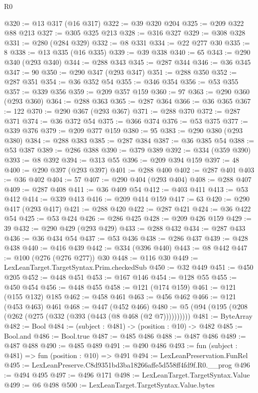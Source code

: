 \begin{lexlean}{R0}
\begin{coremodule}
@320 := @13 @317 (@16 @317)
@322 := @39 @320 @204
@325 := @209 @322 @88 @213
@327 := @305 @325 @213
@328 := @316 @327
@329 := @308 @328
@331 := @280 (@284 @329)
@332 := @8 @331
@334 := @22 @277 @30
@335 := 8
@338 := @13 @335 (@16 @335)
@339 := @39 @338
@340 := 65
@343 := @290 @340 (@293 @340)
@344 := @288 @343
@345 := @287 @344
@346 := @36 @345
@347 := 90
@350 := @290 @347 (@293 @347)
@351 := @288 @350
@352 := @287 @351
@354 := @36 @352 @54
@355 := @346 @354
@356 := @53 @355
@357 := @339 @356
@359 := @209 @357 @159
@360 := 97
@363 := @290 @360 (@293 @360)
@364 := @288 @363
@365 := @287 @364
@366 := @36 @365
@367 := 122
@370 := @290 @367 (@293 @367)
@371 := @288 @370
@372 := @287 @371
@374 := @36 @372 @54
@375 := @366 @374
@376 := @53 @375
@377 := @339 @376
@379 := @209 @377 @159
@380 := 95
@383 := @290 @380 (@293 @380)
@384 := @288 @383
@385 := @287 @384
@387 := @36 @385 @54
@388 := @53 @387
@389 := @286 @388
@390 := @379 @389
@392 := @334 (@359 @390)
@393 := @8 @392
@394 := @313 @55
@396 := @209 @394 @159
@397 := 48
@400 := @290 @397 (@293 @397)
@401 := @288 @400
@402 := @287 @401
@403 := @36 @402
@404 := 57
@407 := @290 @404 (@293 @404)
@408 := @288 @407
@409 := @287 @408
@411 := @36 @409 @54
@412 := @403 @411
@413 := @53 @412
@414 := @339 @413
@416 := @209 @414 @159
@417 := 63
@420 := @290 @417 (@293 @417)
@421 := @288 @420
@422 := @287 @421
@424 := @36 @422 @54
@425 := @53 @424
@426 := @286 @425
@428 := @209 @426 @159
@429 := 39
@432 := @290 @429 (@293 @429)
@433 := @288 @432
@434 := @287 @433
@436 := @36 @434 @54
@437 := @53 @436
@438 := @286 @437
@439 := @428 @438
@440 := @416 @439
@442 := @334 (@396 @440)
@443 := @8 @442
@447 := @100 (@276 (@276 @277)) @30
@448 := @116 @30
@449 := LexLeanTarget.TargetSyntax.Prim.checkedSub
@450 := @32 @449
@451 := @450 @205
@452 := @448 @451
@453 := @167 @146
@454 := @128 @55
@455 := @450 @454
@456 := @448 @455
@458 := @121 (@174 @159)
@461 := @121 (@155 @132) @185
@462 := @458 @461
@463 := @456 @462
@466 := @121 (@453 @463) @461
@468 := @447 (@452 @466)
@480 := @5 (@94 (@195 (@208 (@262 (@275 (@332 (@393 (@443 (@8 @468 (@2 @7))))))))))
@481 := ByteArray
@482 := Bool
@484 := (subject : @481) -> (position : @10) -> @482
@485 := Bool.and
@486 := Bool.true
@487 := @485 @486
@488 := @487 @486
@489 := @487 @488
@490 := @485 @489
@491 := @490 @486
@493 := fun (subject : @481) => fun (position : @10) => @491
@494 := LexLeanPreservation.FunRel
@495 := LexLeanPreserve.C8d9351bd3ba18266affe5d558ff4fd9f.R0.__prog
@496 := @494 @495
@497 := @496 @171
@498 := LexLeanTarget.TargetSyntax.Value
@499 := @6 @498
@500 := LexLeanTarget.TargetSyntax.Value.bytes

\end{coremodule}
\end{lexlean}
